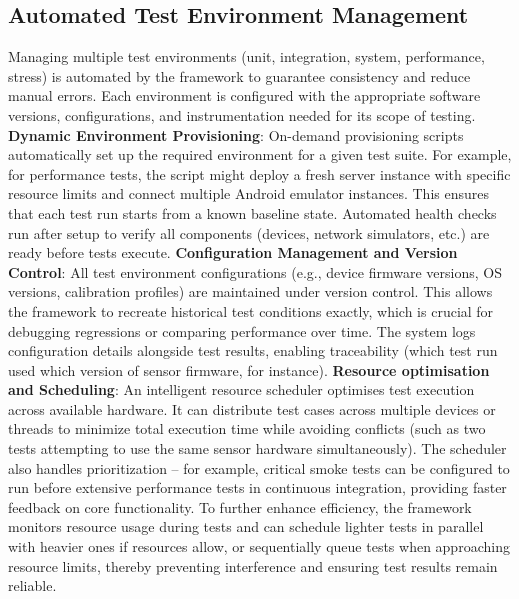 \documentclass[11pt,a4paper]{report}
\begin{document}
\subsection{Automated Test Environment Management}
Managing multiple test environments (unit, integration, system, performance, stress) is automated by the framework to guarantee consistency and reduce manual errors. Each environment is configured with the appropriate software versions, configurations, and instrumentation needed for its scope of testing.
\textbf{Dynamic Environment Provisioning}: On-demand provisioning scripts automatically set up the required environment for a given test suite. For example, for performance tests, the script might deploy a fresh server instance with specific resource limits and connect multiple Android emulator instances. This ensures that each test run starts from a known baseline state. Automated health checks run after setup to verify all components (devices, network simulators, etc.) are ready before tests execute.
\textbf{Configuration Management and Version Control}: All test environment configurations (e.g., device firmware versions, OS versions, calibration profiles) are maintained under version control. This allows the framework to recreate historical test conditions exactly, which is crucial for debugging regressions or comparing performance over time. The system logs configuration details alongside test results, enabling traceability (which test run used which version of sensor firmware, for instance).
\textbf{Resource optimisation and Scheduling}: An intelligent resource scheduler optimises test execution across available hardware. It can distribute test cases across multiple devices or threads to minimize total execution time while avoiding conflicts (such as two tests attempting to use the same sensor hardware simultaneously). The scheduler also handles prioritization – for example, critical smoke tests can be configured to run before extensive performance tests in continuous integration, providing faster feedback on core functionality.
To further enhance efficiency, the framework monitors resource usage during tests and can schedule lighter tests in parallel with heavier ones if resources allow, or sequentially queue tests when approaching resource limits, thereby preventing interference and ensuring test results remain reliable.
\end{document}
